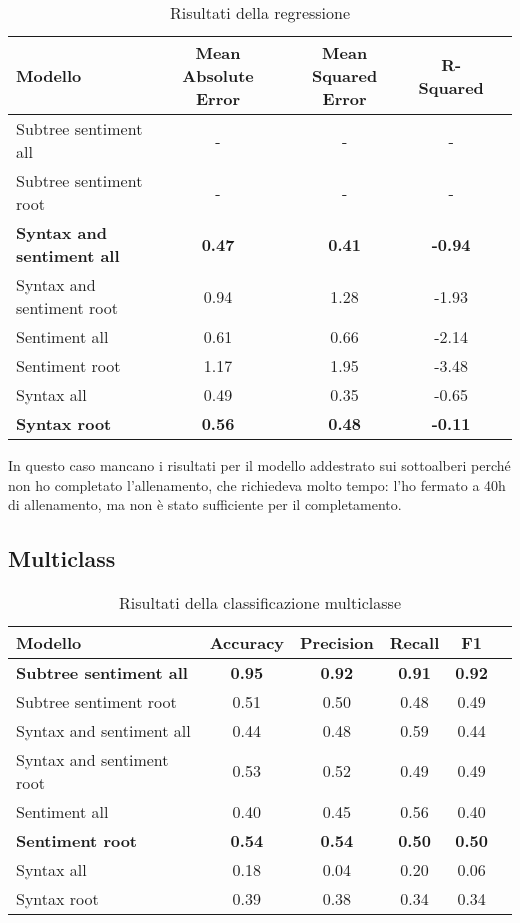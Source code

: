 \begin{table}[H]
    \centering
    \begin{tabular}{|l|c|c|c|c|}
    \hline
    Modello & Mean Absolute Error & Mean Squared Error & R-Squared \\
    \hline
    Subtree sentiment all & - & - & - \\
    Subtree sentiment root & - & - & - \\
    \hline

    \textbf{Syntax and sentiment all} & \textbf{0.47} & \textbf{0.41} &
        \textbf{-0.94} \\
    Syntax and sentiment root & 0.94 & 1.28 & -1.93 \\
    \hline

    Sentiment all & 0.61 & 0.66 & -2.14 \\
    Sentiment root & 1.17 & 1.95 & -3.48 \\
    \hline

    Syntax all & 0.49 & 0.35 & -0.65 \\
    \textbf{Syntax root} & \textbf{0.56} & \textbf{0.48} & \textbf{-0.11} \\
    \hline
    \end{tabular}
    \caption{Risultati della regressione}
\end{table}

In questo caso mancano i risultati per il modello addestrato sui sottoalberi
perché non ho completato l'allenamento, che richiedeva molto tempo: l'ho fermato
a 40h di allenamento, ma non è stato sufficiente per il completamento.

\subsection{Multiclass}

\begin{table}[H]
    \centering
    \begin{tabular}{|l|c|c|c|c|c|}
    \hline
    Modello & Accuracy & Precision & Recall & F1 \\
    \hline
    \textbf{Subtree sentiment all} & \textbf{0.95} & \textbf{0.92} &
        \textbf{0.91} & \textbf{0.92} \\
    Subtree sentiment root & 0.51 & 0.50 & 0.48 & 0.49 \\
    \hline

    Syntax and sentiment all & 0.44 & 0.48 & 0.59 & 0.44 \\
    Syntax and sentiment root & 0.53 & 0.52 & 0.49 & 0.49 \\
    \hline

    Sentiment all & 0.40 & 0.45 & 0.56 & 0.40 \\
    \textbf{Sentiment root} & \textbf{0.54} & \textbf{0.54} & \textbf{0.50}
        & \textbf{0.50} \\
    \hline

    Syntax all & 0.18 & 0.04 & 0.20 & 0.06 \\
    Syntax root & 0.39 & 0.38 & 0.34 & 0.34 \\
    \hline
    \end{tabular}
    \caption{Risultati della classificazione multiclasse}
\end{table}

